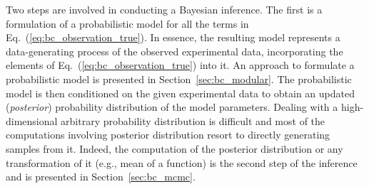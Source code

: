Two steps are involved in conducting a Bayesian inference.
The first is a formulation of a probabilistic model for all the terms in Eq.~(\ref{eq:bc_observation_true}).
In essence, the resulting model represents a data-generating process of the observed experimental data,
incorporating the elements of Eq.~(\ref{eq:bc_observation_true}) into it.
An approach to formulate a probabilistic model is presented in Section~\ref{sec:bc_modular}.
The probabilistic model is then conditioned on the given experimental data to obtain an updated (\emph{posterior}) probability distribution of the model parameters.
Dealing with a high-dimensional arbitrary probability distribution is difficult and most of the computations involving  posterior distribution resort to directly generating samples from it. 
Indeed, the computation of the posterior distribution or any transformation of it (e.g., mean of a function) is the second step of the inference and is presented in Section~\ref{sec:bc_mcmc}.
